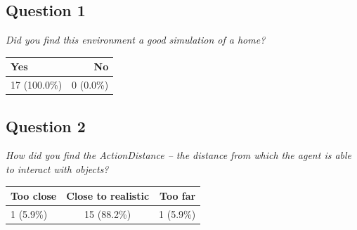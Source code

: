 \subsection{Question 1}
\emph{Did you find this environment a good simulation of a home?}
\begin{table}[H]
	\begin{center}
		\small \begin{tabular*}{0.35\columnwidth}{lr}
			\\ \hline \hline
			Yes & No \\ \hline \hline

		 	17 (100.0\%) & 0 (0.0\%)\\ \hline
		\end{tabular*}
	\end{center}
\end{table}

\subsection{Question 2}
\emph{How did you find the ActionDistance -- the distance from which the agent is able to interact with objects?}
\begin{table}[H]
	\begin{center}
		\small \begin{tabular*}{0.6\columnwidth}{lcr}
			\\ \hline \hline
			Too close & Close to realistic & Too far \\ \hline \hline

		 	1 (5.9\%) & 15 (88.2\%) & 1 (5.9\%)\\ \hline
		\end{tabular*}
	\end{center}
\end{table}

